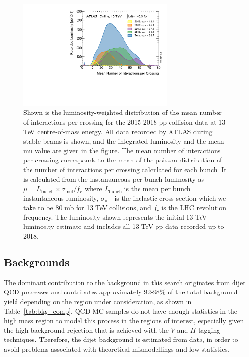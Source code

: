 \begin{figure}[htbp!]
\begin{center}
    \includegraphics[width=0.7\textwidth]{mu_2015_2018}
\end{center}
\caption{
Shown is the luminosity-weighted distribution of the mean number of interactions per crossing for the 2015-2018 pp collision data at 13 TeV centre-of-mass energy.
All data recorded by ATLAS during stable beams is shown, and the integrated luminosity and the mean mu value are given in the figure.
The mean number of interactions per crossing corresponds to the mean of the poisson distribution of the number of interactions per crossing calculated for each bunch.
It is calculated from the instantaneous per bunch luminosity as $\mu = L_{\mathrm{bunch}} × \sigma_{\mathrm{inel}} / f_r$ where $L_{\mathrm{bunch}}$ is the mean per bunch instantaneous luminosity, $\sigma_{\mathrm{inel}}$ is the inelastic cross section which we take to be 80 mb for 13 TeV collisions, and $f_r$ is the LHC revolution frequency.
The luminosity shown represents the initial 13 TeV luminosity estimate and includes all 13 TeV pp data recorded up to 2018.
}
\label{fig:mu_per_year}
\end{figure}

\subsection{Backgrounds}
The dominant contribution to the background in this search originates from dijet QCD processes and contributes approximately 92-98\% of the total background yield depending on the region under consideration, as shown in Table~\ref{tab:bkg_comp}.
QCD MC samples do not have enough statistics in the high mass region to model this process in the regions of interest, especially given the high background rejection that is achieved with the $V$ and $H$ tagging techniques.
Therefore, the dijet background is estimated from data, in order to avoid problems associated with theoretical mismodellings and low statistics.

